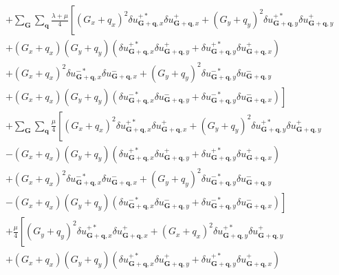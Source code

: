 \documentclass[aps,prx,10pt,twocolumn,superscriptaddress]{revtex4}
\begin{document}
\begin{widetext}
\begin{align}
&+\sum_{\textbf{G}}\sum_{\textbf{q}}\frac{\lambda+\mu}{4}\left[ (G_{x}+q_{x})^{2}\delta u^{+*}_{\textbf{G}+\textbf{q},x}\delta u^{+}_{\textbf{G}+\textbf{q},x} + (G_{y}+q_{y})^{2}\delta u^{+*}_{\textbf{G}+\textbf{q},y}\delta u^{+}_{\textbf{G}+\textbf{q},y} \right.\nonumber\\
&+(G_{x}+q_{x})(G_{y}+q_{y})(\delta u^{+*}_{\textbf{G}+\textbf{q},x}\delta u^{+}_{\textbf{G}+\textbf{q},y}+\delta u^{+*}_{\textbf{G}+\textbf{q},y}\delta u^{+}_{\textbf{G}+\textbf{q},x}) \nonumber \\
&+(G_{x}+q_{x})^{2}\delta u^{-*}_{\textbf{G}+\textbf{q},x}\delta u^{-}_{\textbf{G}+\textbf{q},x} + (G_{y}+q_{y})^{2}\delta u^{-*}_{\textbf{G}+\textbf{q},y}\delta u^{-}_{\textbf{G}+\textbf{q},y}\nonumber \\
&+\left.(G_{x}+q_{x})(G_{y}+q_{y})(\delta u^{-*}_{\textbf{G}+\textbf{q},x}\delta u^{-}_{\textbf{G}+\textbf{q},y}+\delta u^{-*}_{\textbf{G}+\textbf{q},y}\delta u^{-}_{\textbf{G}+\textbf{q},x})  \right]\nonumber\\
&+\sum_{\textbf{G}}\sum_{\textbf{q}}\frac{\mu}{4}\left[ (G_{x}+q_{x})^{2}\delta u^{+*}_{\textbf{G}+\textbf{q},x}\delta u^{+}_{\textbf{G}+\textbf{q},x} + (G_{y}+q_{y})^{2}\delta u^{+*}_{\textbf{G}+\textbf{q},y}\delta u^{+}_{\textbf{G}+\textbf{q},y} \right.\nonumber\\
&-(G_{x}+q_{x})(G_{y}+q_{y})(\delta u^{+*}_{\textbf{G}+\textbf{q},x}\delta u^{+}_{\textbf{G}+\textbf{q},y}+\delta u^{+*}_{\textbf{G}+\textbf{q},y}\delta u^{+}_{\textbf{G}+\textbf{q},x})  \nonumber\\
&+(G_{x}+q_{x})^{2}\delta u^{-*}_{\textbf{G}+\textbf{q},x}\delta u^{-}_{\textbf{G}+\textbf{q},x} + (G_{y}+q_{y})^{2}\delta u^{-*}_{\textbf{G}+\textbf{q},y}\delta u^{-}_{\textbf{G}+\textbf{q},y} \nonumber\\
&-\left.(G_{x}+q_{x})(G_{y}+q_{y})(\delta u^{-*}_{\textbf{G}+\textbf{q},x}\delta u^{-}_{\textbf{G}+\textbf{q},y}+\delta u^{-*}_{\textbf{G}+\textbf{q},y}\delta u^{-}_{\textbf{G}+\textbf{q},x})  \right]\nonumber\\
&+\frac{\mu}{4}\left[ (G_{y}+q_{y})^{2}\delta u^{+*}_{\textbf{G}+\textbf{q},x}\delta u^{+}_{\textbf{G}+\textbf{q},x} + (G_{x}+q_{x})^{2}\delta u^{+*}_{\textbf{G}+\textbf{q},y}\delta u^{+}_{\textbf{G}+\textbf{q},y} \right.\nonumber\\
&+(G_{x}+q_{x})(G_{y}+q_{y})(\delta u^{+*}_{\textbf{G}+\textbf{q},x}\delta u^{+}_{\textbf{G}+\textbf{q},y}+\delta u^{+*}_{\textbf{G}+\textbf{q},y}\delta u^{+}_{\textbf{G}+\textbf{q},x})  \nonumber\\

\end{align}
\end{widetext}
\end{document}
